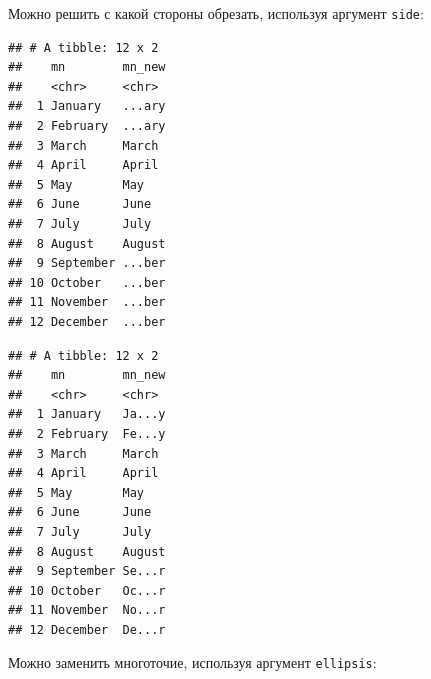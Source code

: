 \documentclass[
]{book}
\newenvironment{Shaded}{\begin{snugshade}}{\end{snugshade}}
\newcommand{\DataTypeTok}[1]{\textcolor[rgb]{0.13,0.29,0.53}{#1}}
\newcommand{\DecValTok}[1]{\textcolor[rgb]{0.00,0.00,0.81}{#1}}
\newcommand{\KeywordTok}[1]{\textcolor[rgb]{0.13,0.29,0.53}{\textbf{#1}}}
\newcommand{\NormalTok}[1]{#1}
\newcommand{\OperatorTok}[1]{\textcolor[rgb]{0.81,0.36,0.00}{\textbf{#1}}}
\newcommand{\StringTok}[1]{\textcolor[rgb]{0.31,0.60,0.02}{#1}}
\begin{document}
Можно решить с какой стороны обрезать, используя аргумент \texttt{side}:

\begin{Shaded}
\end{Shaded}

\begin{verbatim}
## # A tibble: 12 x 2
##    mn        mn_new
##    <chr>     <chr> 
##  1 January   ...ary
##  2 February  ...ary
##  3 March     March 
##  4 April     April 
##  5 May       May   
##  6 June      June  
##  7 July      July  
##  8 August    August
##  9 September ...ber
## 10 October   ...ber
## 11 November  ...ber
## 12 December  ...ber
\end{verbatim}

\begin{Shaded}
\end{Shaded}

\begin{verbatim}
## # A tibble: 12 x 2
##    mn        mn_new
##    <chr>     <chr> 
##  1 January   Ja...y
##  2 February  Fe...y
##  3 March     March 
##  4 April     April 
##  5 May       May   
##  6 June      June  
##  7 July      July  
##  8 August    August
##  9 September Se...r
## 10 October   Oc...r
## 11 November  No...r
## 12 December  De...r
\end{verbatim}

Можно заменить многоточие, используя аргумент \texttt{ellipsis}:

\begin{Shaded}
\end{Shaded}
\end{document}
